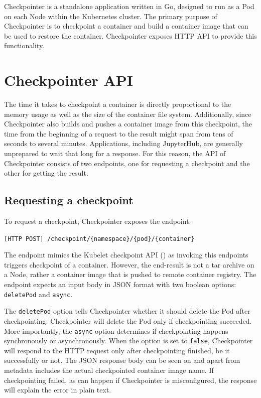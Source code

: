 \documentclass[
  digital,     %
  oneside,     %
  nosansbold,  %
  nocolorbold, %
  lof,         %
  nolot,         %
]{fithesis4}
\begin{document}
Checkpointer is a standalone application written in Go, designed to run as a Pod on each Node within the Kubernetes cluster. The primary purpose of Checkpointer is to checkpoint a container and build a container image that can be used to restore the container. Checkpointer exposes HTTP API to provide this functionality.

\section{Checkpointer API}
The time it takes to checkpoint a container is directly proportional to the memory usage as well as the size of the container file system. Additionally, since Checkpointer also builds and pushes a container image from this checkpoint, the time from the beginning of a request to the result might span from tens of seconds to several minutes. Applications, including JupyterHub, are generally unprepared to wait that long for a response. For this reason, the API of Checkpointer consists of two endpoints, one for requesting a checkpoint and the other for getting the result.

\subsection{Requesting a checkpoint}
To request a checkpoint, Checkpointer exposes the endpoint:
\begin{description}
  \item \texttt{[HTTP POST] /checkpoint/\{namespace\}/\{pod\}/\{container\}}
\end{description}
The endpoint mimics the Kubelet checkpoint API () as invoking this endpoints triggers checkpoint of a container. However, the end-result is not a tar archive on a Node, rather a container image that is pushed to remote container registry. The endpoint expects an input body in JSON format with two boolean options: \texttt{deletePod} and \texttt{async}. 

The \texttt{deletePod} option tells Checkpointer whether it should delete the Pod after checkpointing. Checkpointer will delete the Pod only if checkpointing succeeded. More importantly, the \texttt{async} option determines if checkpointing happens synchronously or asynchronously. When the option is set to \texttt{false}, Checkpointer will respond to the HTTP request only after checkpointing finished, be it successfully or not. The JSON response body can be seen on  and apart from metadata includes the actual checkpointed container image name. If checkpointing failed, as can happen if Checkpointer is misconfigured, the response will explain the error in plain text.
\end{document}
